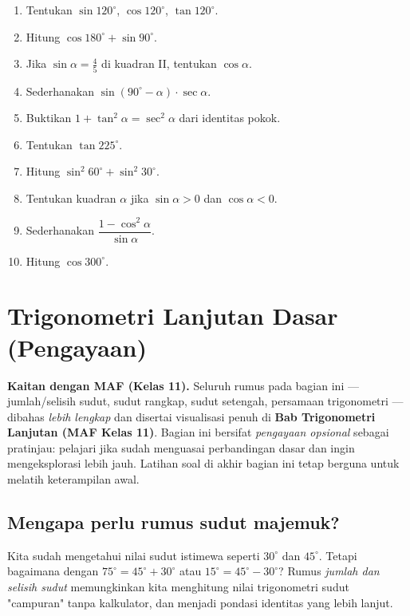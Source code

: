 \documentclass[11pt,a4paper]{report}
\theoremstyle{gaya}
\begin{document}
\begin{latihan}
\begin{enumerate}[leftmargin=*]
  \item Tentukan $\sin120^\circ$, $\cos120^\circ$, $\tan120^\circ$.
  \item Hitung $\cos180^\circ+\sin90^\circ$.
  \item Jika $\sin\alpha=\tfrac45$ di kuadran II, tentukan $\cos\alpha$.
  \item Sederhanakan $\sin(90^\circ-\alpha)\cdot\sec\alpha$.
  \item Buktikan $1+\tan^2\alpha=\sec^2\alpha$ dari identitas pokok.
  \item Tentukan $\tan 225^\circ$.
  \item Hitung $\sin^2 60^\circ+\sin^2 30^\circ$.
  \item Tentukan kuadran $\alpha$ jika $\sin\alpha>0$ dan $\cos\alpha<0$.
  \item Sederhanakan $\dfrac{1-\cos^2\alpha}{\sin\alpha}$.
  \item Hitung $\cos 300^\circ$.
\end{enumerate}
\end{latihan}

\section{Trigonometri Lanjutan Dasar (Pengayaan)}

\begin{catatan}
\textbf{Kaitan dengan MAF (Kelas 11).} Seluruh rumus pada bagian ini --- jumlah/selisih sudut, sudut rangkap, sudut setengah, persamaan trigonometri --- dibahas \emph{lebih lengkap} dan disertai visualisasi penuh di \textbf{Bab Trigonometri Lanjutan (MAF Kelas 11)}. Bagian ini bersifat \emph{pengayaan opsional} sebagai pratinjau: pelajari jika sudah menguasai perbandingan dasar dan ingin mengeksplorasi lebih jauh. Latihan soal di akhir bagian ini tetap berguna untuk melatih keterampilan awal.
\end{catatan}

\subsection*{Mengapa perlu rumus sudut majemuk?}
Kita sudah mengetahui nilai sudut istimewa seperti $30^\circ$ dan $45^\circ$. Tetapi bagaimana dengan $75^\circ=45^\circ+30^\circ$ atau $15^\circ=45^\circ-30^\circ$? Rumus \emph{jumlah dan selisih sudut} memungkinkan kita menghitung nilai trigonometri sudut "campuran" tanpa kalkulator, dan menjadi pondasi identitas yang lebih lanjut.
\end{document}
